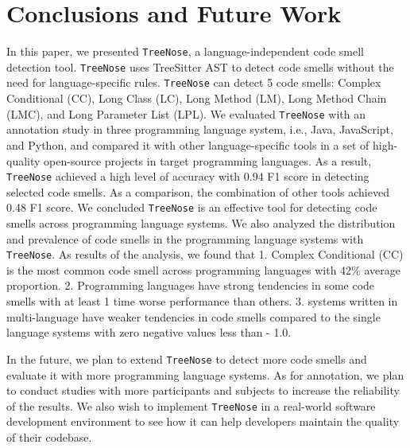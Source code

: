 \section{Conclusions and Future Work}
\label{sec:conclusions-and-future-work}

In this paper, we presented \texttt{TreeNose}, a language-independent code smell detection tool.
\texttt{TreeNose} uses TreeSitter AST to detect code smells without the need for language-specific rules.
\texttt{TreeNose} can detect 5 code smells: Complex Conditional (CC), Long Class (LC), Long Method (LM), Long Method Chain (LMC), and Long Parameter List (LPL).
We evaluated \texttt{TreeNose} with an annotation study in three programming language system, i.e., Java, JavaScript, and Python,
and compared it with other language-specific tools in a set of high-quality open-source projects in target programming languages. 
As a result, \texttt{TreeNose} achieved a high level of accuracy with 0.94 F1 score in detecting selected code smells. As a comparison, the combination of other tools achieved 0.48 F1 score.
We concluded \texttt{TreeNose} is an effective tool for detecting code smells across programming language systems.
We also analyzed the distribution and prevalence of code smells in the programming language systems with \texttt{TreeNose}. As results of the analysis, we found that
1. Complex Conditional (CC) is the most common code smell across programming languages with 42\% average proportion.
2. Programming languages have strong tendencies in some code smells with at least 1 time worse performance than others.
3. systems written in multi-language have weaker tendencies in code smells compared to the single language systems with zero negative values less than - 1.0.

In the future, we plan to extend \texttt{TreeNose} to detect more code smells and evaluate it with more programming language systems. As for annotation,
we plan to conduct studies with more participants and subjects to increase the reliability of the results.
We also wish to implement \texttt{TreeNose} in a real-world software development environment to see how it can help developers maintain the quality of their codebase.